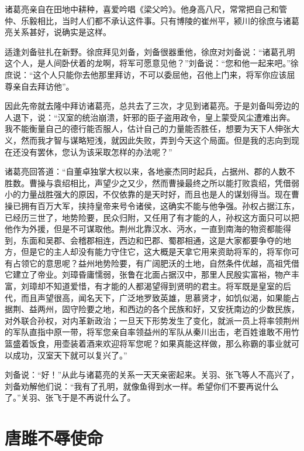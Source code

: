 \documentclass[12pt,UTF-8,openany,a4]{ctexbook}
\begin{document}
\begin{large}
    \yiwen 
    诸葛亮亲自在田地中耕种，喜爱吟唱《梁父吟》。他身高八尺，常常把自己和管仲、乐毅相比，当时人们都不承认这件事。只有博陵的崔州平，颍川的徐庶与诸葛亮关系甚好，说确实是这样。
    
    适逢刘备驻扎在新野。徐庶拜见刘备，刘备很器重他，徐庶对刘备说：“诸葛孔明这个人，是人间卧伏着的龙啊，将军可愿意见他？”刘备说：“您和他一起来吧。”徐庶说：“这个人只能你去他那里拜访，不可以委屈他，召他上门来，将军你应该屈尊亲自去拜访他”。
    
    因此先帝就去隆中拜访诸葛亮，总共去了三次，才见到诸葛亮。于是刘备叫旁边的人退下，说：“汉室的统治崩溃，奸邪的臣子盗用政令，皇上蒙受风尘遭难出奔。我不能衡量自己的德行能否服人，估计自己的力量能否胜任，想要为天下人伸张大义，然而我才智与谋略短浅，就因此失败，弄到今天这个局面。但是我的志向到现在还没有罢休，您认为该采取怎样的办法呢？”
    
    诸葛亮回答道：“自董卓独掌大权以来，各地豪杰同时起兵，占据州、郡的人数不胜数。曹操与袁绍相比，声望少之又少，然而曹操最终之所以能打败袁绍，凭借弱小的力量战胜强大的原因，不仅依靠的是天时好，而且也是人的谋划得当。现在曹操已拥有百万大军，挟持皇帝来号令诸侯，这确实不能与他争强。孙权占据江东，已经历三世了，地势险要，民众归附，又任用了有才能的人，孙权这方面只可以把他作为外援，但是不可谋取他。荆州北靠汉水、沔水，一直到南海的物资都能得到，东面和吴郡、会稽郡相连，西边和巴郡、蜀郡相通，这是大家都要争夺的地方，但是它的主人却没有能力守住它，这大概是天拿它用来资助将军的，将军你可有占领它的意思呢？益州地势险要，有广阔肥沃的土地，自然条件优越，高祖凭借它建立了帝业。刘璋昏庸懦弱，张鲁在北面占据汉中，那里人民殷实富裕，物产丰富，刘璋却不知道爱惜，有才能的人都渴望得到贤明的君主。将军既是皇室的后代，而且声望很高，闻名天下，广泛地罗致英雄，思慕贤才，如饥似渴，如果能占据荆、益两州，固守险要之地，和西边的各个民族和好，又安抚南边的少数民族，对外联合孙权，对内革新政治；一旦天下形势发生了变化，就派一员上将率领荆州的军队直指中原一带，将军您亲自率领益州的军队从秦川出击，老百姓谁敢不用竹篮盛着饭食，用壶装着酒来欢迎将军您呢？如果真能这样做，那么称霸的事业就可以成功，汉室天下就可以复兴了。”
    
    刘备说：“好！”从此与诸葛亮的关系一天天亲密起来。关羽、张飞等人不高兴了，刘备劝解他们说：“我有了孔明，就像鱼得到水一样。希望你们不要再说什么了。”关羽、张飞于是不再说什么了。
    
\end{large}



\chapter{唐雎不辱使命}
\end{document}
